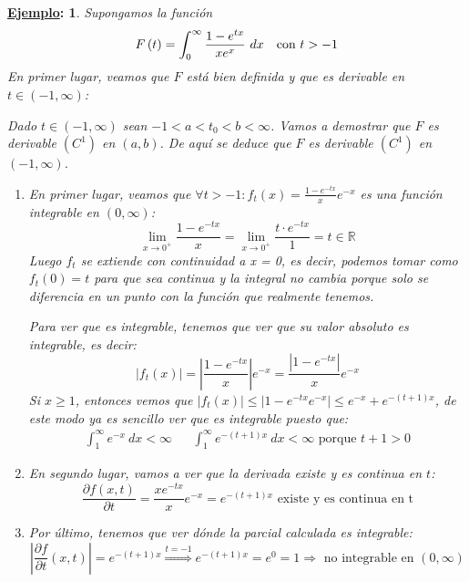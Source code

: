 \documentclass[10pt,a4paper,openright]{book}
\theoremstyle{break}
\newtheorem*{ej}{\underline{Ejemplo}:}
\newcommand{\dif}[1]{\ d#1}
\begin{document}
\begin{ej}
Supongamos la función 
$$F \left(t\right) = \int_0^{\infty} \frac{1 - e^{tx}}{xe^{x}} \dif{x} \text{\quad con } t > -1$$
En primer lugar, veamos que $F$ está bien definida y que es derivable en $t \in \left(-1, \infty\right)$:

Dado $t \in \left(-1, \infty\right)$ sean $-1 < a < t_0 < b <\infty$. Vamos a demostrar que $F$ es derivable $\left(C^1\right)$ en $\left(a, b\right)$. De aquí se deduce que $F$ es derivable $\left(C^1\right)$ en $\left(-1, \infty\right)$.

\begin{enumerate}
    \item En primer lugar, veamos que $\forall t > -1: f_t \left(x\right) = \frac{1 - e^{-tx}}{x} e^{-x}$ es una función integrable en $\left(0, \infty\right)$:
    $$\lim_{x \rightarrow 0^+} \frac{1 - e^{-tx}}{x} = \lim_{x \rightarrow 0^+} \frac{t\cdot e^{-tx}}{1} = t \in \mathbb{R}$$
    Luego $f_t$ se extiende con continuidad a x = 0, es decir, podemos tomar como $f_t(0)=t$ para que sea continua y la integral no cambia porque solo se diferencia en un punto con la función que realmente tenemos.
    
    Para ver que es integrable, tenemos que ver que su valor absoluto es integrable, es decir:
    $$\left\vert f_t \left(x\right)\right\vert = \left\vert \frac{1 - e^{-tx}}{x}\right\vert e^{-x} = \frac{\left\vert 1 - e^{-tx}\right\vert}{x} e^{-x}$$
    Si $x \geq 1$, entonces vemos que $\vert f_t \left(x\right) \vert \le \vert 1 - e^{-tx} e^{-x} \vert \le e^{-x} + e^{-\left(t+1\right)x}$, de este modo ya es sencillo ver que es integrable puesto que:
    \begin{align*}
    \int_1^{\infty} e^{-x} \dif{x} < \infty  && \int_1^{\infty} e^{-\left(t + 1\right)x} \dif{x} < \infty \text{ porque } t + 1 > 0
	\end{align*}

    \item En segundo lugar, vamos a ver que la derivada existe y es continua en $t$:
    $$\frac{\partial f\left(x, t\right)}{\partial t}  = \frac{xe^{-tx}}{x}e^{-x} = e^{-\left(t+1\right)x} \text{ existe y es continua en t}$$
    \item Por último, tenemos que ver dónde la parcial calculada es integrable:
    $$\left\vert \frac{\partial f}{\partial t} \left(x, t\right)\right\vert = e^{-\left(t+1\right)x}\stackrel{t=-1}{\Rightarrow} e^{-\left(t+1\right)x} = e^{0} = 1 \Rightarrow \text{ no integrable en } \left(0, \infty\right)$$


\end{enumerate}
\end{ej}
\end{document}
